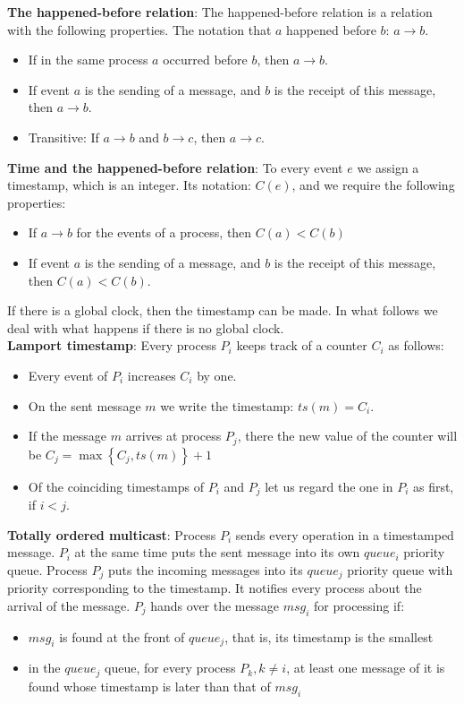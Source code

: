 \documentclass[margin=0px]{article}
\begin{document}
\noindent \textbf{The happened-before relation}: The happened-before relation is a relation with the following properties.
The notation that $a$ happened before $b$: $a \to b$.

\begin{itemize}
    \item	If in the same process $a$ occurred before $b$, then $a \to b$.
    \item	If event $a$ is the sending of a message, and $b$ is the receipt of this message, then $a \to b$.
    \item	Transitive: If $a \to b$ and $b \to c$, then $a \to c$.
\end{itemize}

\noindent \textbf{Time and the happened-before relation}: To every event $e$ we assign a timestamp, which is an integer. Its notation:
$C(e)$, and we require the following properties:

\begin{itemize}
    \item	If $a \to b$ for the events of a process, then $C(a)<C(b)$
    \item	If event $a$ is the sending of a message, and $b$ is the receipt of this message, then $C(a)<C(b)$.
\end{itemize}

If there is a global clock, then the timestamp can be made. In what follows we deal with what happens if there is no global
clock.\\

\noindent \textbf{Lamport timestamp}: Every process $P_{i}$ keeps track of a counter $C_{i}$ as follows:
\begin{itemize}
    \item	Every event of $P_{i}$ increases $C_{i}$ by one.
    \item	On the sent message $m$ we write the timestamp: $ts(m) = C_{i}$.
    \item	If the message $m$ arrives at process $P_{j}$, there the new value of the counter
          will be $C_{j} = \max \left\{C_{j},ts(m)\right\}+1$
    \item	Of the coinciding timestamps of $P_{i}$ and $P_{j}$ let us regard the one in $P_{i}$ as first, if $i<j$.
\end{itemize}

\noindent \textbf{Totally ordered multicast}: Process $P_{i}$ sends every operation in a timestamped
message. $P_{i}$ at the same time puts the sent message into its own $queue_{i}$ priority queue. Process $P_{j}$
puts the incoming messages into its $queue_{j}$ priority queue with priority corresponding to the timestamp.
It notifies every process about the arrival of the message.
$P_{j}$ hands over the message $msg_{i}$ for processing if:
\begin{itemize}
    \item	$msg_{i}$ is found at the front of $queue_{j}$, that is, its timestamp is the smallest
    \item	in the $queue_{j}$ queue, for every process $P_{k}, k \not = i$, at least one message of it is found whose
          timestamp is later than that of $msg_{i}$

\end{itemize}
\end{document}
